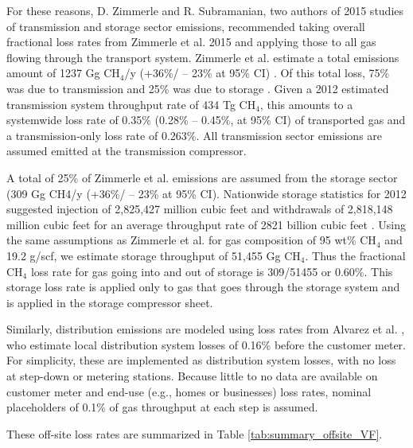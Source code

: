 \documentclass[11pt]{report}
\begin{document}
{{{{For these reasons, D. Zimmerle and R. Subramanian, two authors of 2015 studies of transmission and storage sector emissions, recommended \cite{ZimmerleEmail} taking overall fractional loss rates from Zimmerle et al. 2015 \cite{Zimmerle2015} and applying those to all gas flowing through the transport system. Zimmerle et al. estimate a total emissions amount of 1237 Gg CH$_4$/y (+36\%/ -- 23\% at 95\% CI) \cite[p. 9378]{Zimmerle2015}. Of this total loss, 75\% was due to transmission and 25\% was due to storage \cite[Fig. 6]{Zimmerle2015}. Given a 2012 estimated transmission system throughput rate of 434 Tg CH$_4$, this amounts to a systemwide loss rate of 0.35\% (0.28\% -- 0.45\%, at 95\% CI) of transported gas and a transmission-only loss rate of 0.263\%.  All transmission sector emissions are assumed emitted at the transmission compressor. 

A total of 25\% of Zimmerle et al. \cite{Zimmerle2015} emissions are assumed from the storage sector (309 Gg CH4/y (+36\%/ -- 23\% at 95\% CI). Nationwide storage statistics for 2012 suggested injection of 2,825,427 million cubic feet and withdrawals of 2,818,148 million cubic feet for an average throughput rate of 2821 billion cubic feet \cite{EIA2018}. Using the same assumptions as Zimmerle et al. for gas composition \cite[SI section 16]{Zimmerle2015} of 95 wt\% CH$_4$ and 19.2 g/scf, we estimate storage throughput of 51,455 Gg CH$_4$. Thus the fractional CH$_4$ loss rate for gas going into and out of storage is 309/51455 or 0.60\%. This storage loss rate is applied only to gas that goes through the storage system and is applied in the storage compressor sheet.

Similarly, distribution emissions are modeled using loss rates from Alvarez et al. \cite[SI p. 14]{Alvarez2018}, who estimate local distribution system losses of 0.16\% before the customer meter.  For simplicity, these are implemented as distribution system losses, with no loss at step-down or metering stations.  Because little to no data are available on customer meter and end-use (e.g., homes or businesses) loss rates, nominal placeholders of 0.1\% of gas throughput at each step is assumed.

These off-site loss rates are summarized in Table \ref{tab:summary_offsite_VF}.



}}}}
\end{document}
